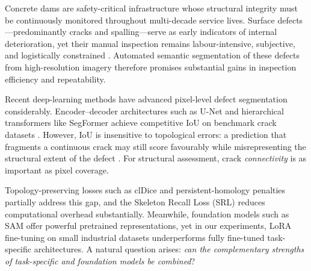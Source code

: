 \documentclass[review,authoryear]{elsarticle}
\begin{document}
Concrete dams are safety-critical infrastructure whose structural integrity must be continuously monitored throughout multi-decade service lives.
Surface defects---predominantly cracks and spalling---serve as early indicators of internal deterioration, yet their manual inspection remains labour-intensive, subjective, and logistically constrained \citep{chen2024damsurvey,li2024dam}.
Automated semantic segmentation of these defects from high-resolution imagery therefore promises substantial gains in inspection efficiency and repeatability.

Recent deep-learning methods have advanced pixel-level defect segmentation considerably.
Encoder--decoder architectures such as U-Net \citep{ronneberger2015unet} and hierarchical transformers like SegFormer \citep{xie2021segformer} achieve competitive IoU on benchmark crack datasets \citep{zou2019deepcrack,liu2019deepcrack}.
However, IoU is insensitive to topological errors: a prediction that fragments a continuous crack may still score favourably while misrepresenting the structural extent of the defect \citep{pantoja2022topoloss}.
For structural assessment, crack \emph{connectivity} is as important as pixel coverage.

Topology-preserving losses such as clDice \citep{shit2021cldice} and persistent-homology penalties \citep{hu2019topology} partially address this gap, and the Skeleton Recall Loss (SRL) \citep{kirchhoff2024skeleton} reduces computational overhead substantially.
Meanwhile, foundation models such as SAM \citep{kirillov2023sam} offer powerful pretrained representations, yet in our experiments, LoRA fine-tuning \citep{hu2022lora} on small industrial datasets underperforms fully fine-tuned task-specific architectures.
A natural question arises: \emph{can the complementary strengths of task-specific and foundation models be combined}?
\end{document}
